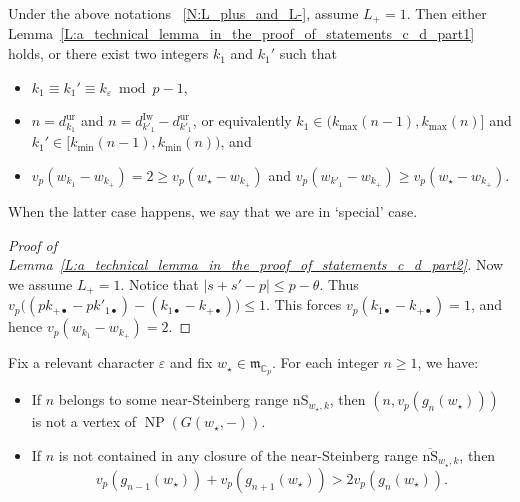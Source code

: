\begin{lemma}
    \label{L:a_technical_lemma_in_the_proof_of_statements_c_d_part2}
    Under the above notations ~\ref{N:L_plus_and_L-}, assume $L_+=1$. Then either Lemma~\ref{L:a_technical_lemma_in_the_proof_of_statements_c_d_part1} holds, or there exist two integers $k_1$ and $k_1'$ such that
    \begin{itemize}
    \item $k_1 \equiv k_1'\equiv k_\varepsilon \bmod p-1$,
    \item $n = d_{k_1}^{\mathrm{ur}}$ and $n = d_{k'_1}^{\mathrm{Iw}}- d_{k'_1}^{\mathrm{ur}}$, or equivalently $k_{1} \in \big( k_{\max}(n-1), k_{\max}(n)\big] $ and $k_1'\in \big[ k_{\min}(n-1), k_{\min}(n)\big)$,
    and
    \item $v_p(w_{k_1} - w_{k_+}) =2\geq v_p(w_\star - w_{k_+})$ and $v_p(w_{k'_1} - w_{k_+}) \geq v_p(w_\star - w_{k_+})$.
    \end{itemize}
    When the latter case happens, we say that we are in `special' case.
\end{lemma}

\begin{proof}
    [Proof of Lemma~\ref{L:a_technical_lemma_in_the_proof_of_statements_c_d_part2}]
    Now we assume $L_+=1$. Notice that $|s+s'-p|\leq p-\theta$. Thus $v_p\big( (pk_{+\bullet}-pk'_{1\bullet}) - (k_{1\bullet} - k_{+\bullet})\big) \leq 1$. This forces $v_p(k_{1\bullet}-k_{+\bullet})= 1$,  and hence $v_p(w_{k_1}-w_{k_+})=2$.
\end{proof}

\begin{proposition}
    \label{P:near-Steinberg-nonvertex-ab_part2}
    Fix a relevant character $\varepsilon$ and fix $w_\star \in {\mathfrak{m}}_{{\mathbb{C}}_p}$. For each integer $n\ge 1$, we have:
    \begin{itemize}
    \item[(a)] If $n$ belongs to some near-Steinberg range ${\mathrm{nS}}_{w_\star, k}$, then $(n, v_p(g_n(w_\star)))$ is not a vertex of ${\operatorname{NP}}(G(w_\star, -))$.
    \item[(b)] If $n$ is not contained in any closure of the near-Steinberg range $\overline{\mathrm{nS}}_{w_\star, k}$, then
    \[
    v_p(g_{n-1}(w_\star)) + v_p(g_{n+1}(w_\star)) > 2v_p(g_n(w_\star)).
    \]
    \end{itemize}
\end{proposition}


